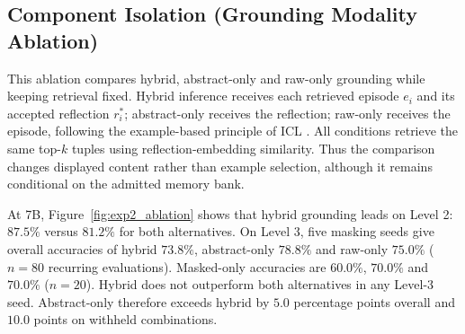 \documentclass[onecolumn]{IEEEtran}
\numberwithin{equation}{section}
\theoremstyle{definition}
\theoremstyle{remark}
\begin{document}
\subsection{Component Isolation (Grounding Modality Ablation)}
\label{sec:exp2}

This ablation compares hybrid, abstract-only and raw-only grounding while keeping retrieval fixed. Hybrid inference receives each retrieved episode $e_i$ and its accepted reflection $r_i^*$; abstract-only receives the reflection; raw-only receives the episode, following the example-based principle of ICL \cite{brown2020language}. All conditions retrieve the same top-$k$ tuples using reflection-embedding similarity. Thus the comparison changes displayed content rather than example selection, although it remains conditional on the admitted memory bank.

At 7B, Figure~\ref{fig:exp2_ablation} shows that hybrid grounding leads on Level 2: $87.5\%$ versus $81.2\%$ for both alternatives. On Level 3, five masking seeds give overall accuracies of hybrid $73.8\%$, abstract-only $78.8\%$ and raw-only $75.0\%$ ($n=80$ recurring evaluations). Masked-only accuracies are $60.0\%$, $70.0\%$ and $70.0\%$ ($n=20$). Hybrid does not outperform both alternatives in any Level-3 seed. Abstract-only therefore exceeds hybrid by $5.0$ percentage points overall and $10.0$ points on withheld combinations.
\end{document}
